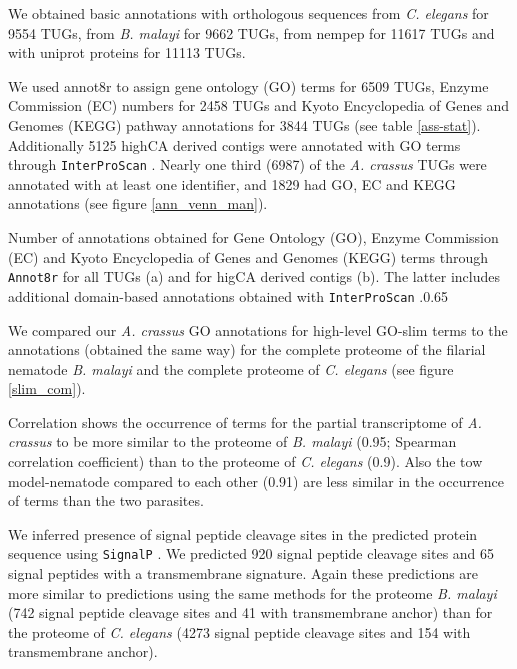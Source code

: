 We obtained basic annotations with orthologous sequences from
\textit{C. elegans} for 9554 TUGs, from \textit{B. malayi} for 9662
TUGs, from nempep \cite{parkinson_nembase:resource_2004, pmid21550347}
for 11617 TUGs and with uniprot proteins for 11113 TUGs.

We used annot8r \cite{schmid_annot8r:_2008} to assign gene ontology
(GO) terms for 6509 TUGs, Enzyme Commission (EC) numbers for 2458 TUGs
and Kyoto Encyclopedia of Genes and Genomes (KEGG) pathway annotations
for 3844 TUGs (see table \ref{ass-stat}). Additionally 5125 highCA
derived contigs were annotated with GO terms through
\texttt{InterProScan} \cite{pmid11590104}. Nearly one third (6987) of
the \textit{A. crassus} TUGs were annotated with at least one
identifier, and 1829 had GO, EC and KEGG annotations (see figure
\ref{ann_venn_man}).

 {Number
  of annotations obtained for Gene Ontology (GO), Enzyme Commission
  (EC) and Kyoto Encyclopedia of Genes and Genomes (KEGG) terms
  through \texttt{Annot8r} \cite{schmid_annot8r:_2008} for all TUGs
  (a) and for higCA derived contigs (b). The latter includes
  additional domain-based annotations obtained with
  \texttt{InterProScan} \cite{pmid11590104}.}{0.65}

We compared our \textit{A. crassus} GO annotations for high-level
GO-slim terms to the annotations (obtained the same way) for the
complete proteome of the filarial nematode \textit{B. malayi} and the
complete proteome of \textit{C. elegans} (see figure \ref{slim_com}).

Correlation shows the occurrence of terms for the partial
transcriptome of \textit{A. crassus} to be more similar to the
proteome of \textit{B. malayi} (0.95; Spearman correlation
coefficient) than to the proteome of \textit{C. elegans} (0.9). Also
the tow model-nematode compared to each other (0.91) are less similar
in the occurrence of terms than the two parasites.


We inferred presence of signal peptide cleavage sites in the predicted
protein sequence using \texttt{SignalP} \cite{pmid21959131}. We
predicted 920 signal peptide cleavage sites and 65 signal peptides
with a transmembrane signature. Again these predictions are more
similar to predictions using the same methods for the proteome
\textit{B. malayi} (742 signal peptide cleavage sites and 41 with
transmembrane anchor) than for the proteome of \textit{C. elegans}
(4273 signal peptide cleavage sites and 154 with transmembrane
anchor).

